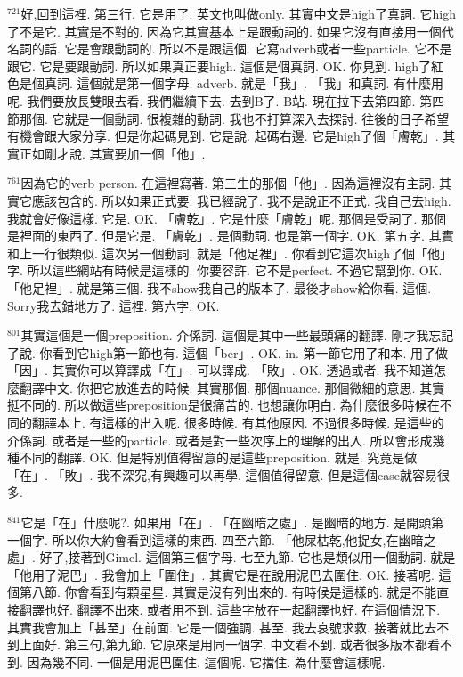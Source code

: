 \documentclass{book}
\begin{document}
$^{721}$好,回到這裡.
第三行.
它是用了.
英文也叫做only.
其實中文是high了真詞.
它high了不是它.
其實是不對的.
因為它其實基本上是跟動詞的.
如果它沒有直接用一個代名詞的話.
它是會跟動詞的.
所以不是跟這個.
它寫adverb或者一些particle.
它不是跟它.
它是要跟動詞.
所以如果真正要high.
這個是個真詞.
OK.
你見到.
high了紅色是個真詞.
這個就是第一個字母.
adverb.
就是「我」.
「我」和真詞.
有什麼用呢.
我們要放長雙眼去看.
我們繼續下去.
去到B了.
B站.
現在拉下去第四節.
第四節那個.
它就是一個動詞.
很複雜的動詞.
我也不打算深入去探討.
往後的日子希望有機會跟大家分享.
但是你起碼見到.
它是說.
起碼右邊.
它是high了個「膚乾」.
其實正如剛才說.
其實要加一個「他」.

$^{761}$因為它的verb person.
在這裡寫著.
第三生的那個「他」.
因為這裡沒有主詞.
其實它應該包含的.
所以如果正式要.
我已經說了.
我不是說正不正式.
我自己去high.
我就會好像這樣.
它是.
OK.
「膚乾」.
它是什麼「膚乾」呢.
那個是受詞了.
那個是裡面的東西了.
但是它是.
「膚乾」.
是個動詞.
也是第一個字.
OK.
第五字.
其實和上一行很類似.
這次另一個動詞.
就是「他足裡」.
你看到它這次high了個「他」字.
所以這些網站有時候是這樣的.
你要容許.
它不是perfect.
不過它幫到你.
OK.
「他足裡」.
就是第三個.
我不show我自己的版本了.
最後才show給你看.
這個.
Sorry我去錯地方了.
這裡.
第六字.
OK.

$^{801}$其實這個是一個preposition.
介係詞.
這個是其中一些最頭痛的翻譯.
剛才我忘記了說.
你看到它high第一節也有.
這個「ber」.
OK.
in.
第一節它用了和本.
用了做「因」.
其實你可以算譯成「在」.
可以譯成.
「敗」.
OK.
透過或者.
我不知道怎麼翻譯中文.
你把它放進去的時候.
其實那個.
那個nuance.
那個微細的意思.
其實挺不同的.
所以做這些preposition是很痛苦的.
也想讓你明白.
為什麼很多時候在不同的翻譯本上.
有這樣的出入呢.
很多時候.
有其他原因.
不過很多時候.
是這些的介係詞.
或者是一些的particle.
或者是對一些次序上的理解的出入.
所以會形成幾種不同的翻譯.
OK.
但是特別值得留意的是這些preposition.
就是.
究竟是做「在」.
「敗」.
我不深究,有興趣可以再學.
這個值得留意.
但是這個case就容易很多.

$^{841}$它是「在」什麼呢?.
如果用「在」.
「在幽暗之處」.
是幽暗的地方.
是開頭第一個字.
所以你大約會看到這樣的東西.
四至六節.
「他屎枯乾,他捉女,在幽暗之處」.
好了,接著到Gimel.
這個第三個字母.
七至九節.
它也是類似用一個動詞.
就是「他用了泥巴」.
我會加上「圍住」.
其實它是在說用泥巴去圍住.
OK.
接著呢.
這個第八節.
你會看到有顆星星.
其實是沒有列出來的.
有時候是這樣的.
就是不能直接翻譯也好.
翻譯不出來.
或者用不到.
這些字放在一起翻譯也好.
在這個情況下.
其實我會加上「甚至」在前面.
它是一個強調.
甚至.
我去哀號求救.
接著就比去不到上面好.
第三句,第九節.
它原來是用同一個字.
中文看不到.
或者很多版本都看不到.
因為幾不同.
一個是用泥巴圍住.
這個呢.
它擋住.
為什麼會這樣呢.
\end{document}
